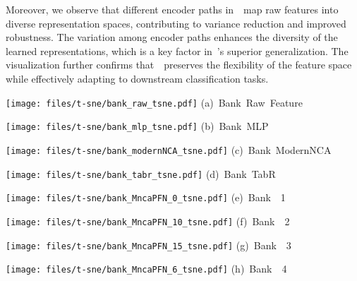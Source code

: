Moreover, we observe that different encoder paths in~\name~map raw features into diverse representation spaces, contributing to variance reduction and improved robustness. The variation among encoder paths enhances the diversity of the learned representations, which is a key factor in~\name's superior generalization. The visualization further confirms that~\name~preserves the flexibility of the feature space while effectively adapting to downstream classification tasks.
\begin{figure*}[t]
    \begin{minipage}{0.24\linewidth}
    \texttt{[image: files/t-sne/bank\_raw\_tsne.pdf]}
    \centering
    {\small \mbox{(a) {Bank  Raw Feature}}}
    \end{minipage}
    \begin{minipage}{0.24\linewidth}
    \texttt{[image: files/t-sne/bank\_mlp\_tsne.pdf]}
    \centering
    {\small \mbox{(b) {Bank  MLP}}}
    \end{minipage}
    \begin{minipage}{0.24\linewidth}
    \texttt{[image: files/t-sne/bank\_modernNCA\_tsne.pdf]}
    \centering
    {\small \mbox{(c) {Bank  ModernNCA}}}
    \end{minipage}
    \begin{minipage}{0.24\linewidth}
    \texttt{[image: files/t-sne/bank\_tabr\_tsne.pdf]}
    \centering
    {\small \mbox{(d) {Bank  TabR}}}
    \end{minipage} 

    \begin{minipage}{0.24\linewidth}
    \texttt{[image: files/t-sne/bank\_MncaPFN\_0\_tsne.pdf]}
    \centering
    {\small \mbox{(e) {Bank  \name~1}}}
    \end{minipage}
    \begin{minipage}{0.24\linewidth}
    \texttt{[image: files/t-sne/bank\_MncaPFN\_10\_tsne.pdf]}
    \centering
    {\small \mbox{(f) {Bank  \name~2}}}
    \end{minipage}
    \begin{minipage}{0.24\linewidth}
    \texttt{[image: files/t-sne/bank\_MncaPFN\_15\_tsne.pdf]}
    \centering
    {\small \mbox{(g) {Bank  \name~3}}}
    \end{minipage}
    \begin{minipage}{0.24\linewidth}
    \texttt{[image: files/t-sne/bank\_MncaPFN\_6\_tsne.pdf]}
    \centering
    {\small \mbox{(h) {Bank  \name~4}}}
    \end{minipage}   



\end{figure*}
